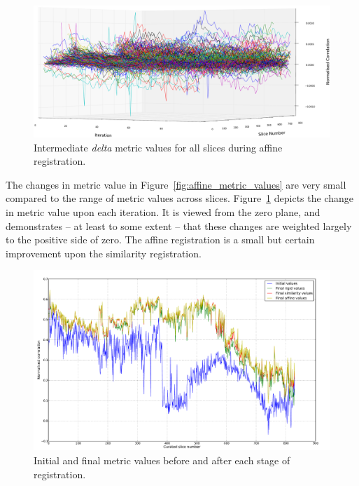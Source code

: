   \begin{figure}
    \centering
    \includegraphics[width=\textheight]{Ch6/Figs/diagnostics/affine_metric_value_differences}
    \caption{Intermediate \emph{delta} metric values for all slices during affine registration.}
    \label{fig:affine_metric_value_differences}
  \end{figure}
  
	The changes in metric value in Figure~\ref{fig:affine_metric_values} are very small compared to the range of metric values across slices. Figure~\ref{fig:affine_metric_value_differences} depicts the change in metric value upon each iteration. It is viewed from the zero plane, and demonstrates -- at least to some extent -- that these changes are weighted largely to the positive side of zero. The affine registration is a small but certain improvement upon the similarity registration.
	
  \begin{figure}
    \centering
    \includegraphics[width=\textheight]{Ch6/Figs/diagnostics/initial_and_final_values_comparison}
    \caption{Initial and final metric values before and after each stage of registration.}
    \label{fig:initial_and_final_values_comparison}
  \end{figure}
  
